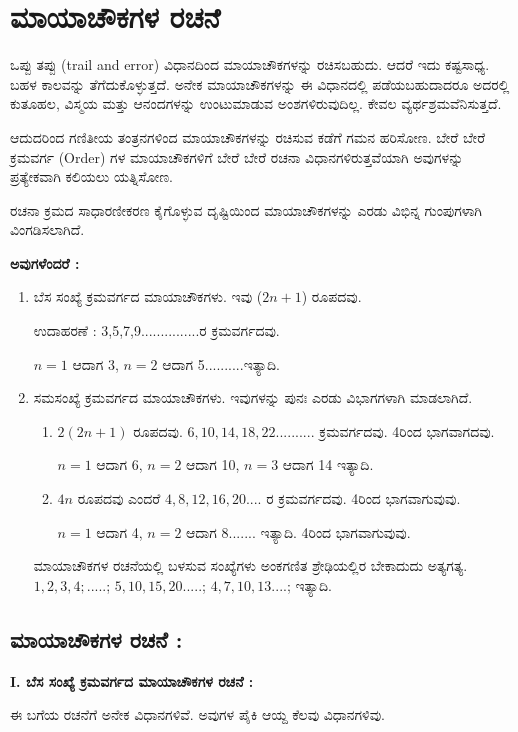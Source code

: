 \chapter{ಮಾಯಾಚೌಕಗಳ ರಚನೆ}
ಒಪ್ಪು ತಪ್ಪು (trail and error) ವಿಧಾನದಿಂದ ಮಾಯಾಚೌಕಗಳನ್ನು ರಚಿಸಬಹುದು. ಆದರೆ ಇದು ಕಷ್ಟಸಾಧ್ಯ. ಬಹಳ ಕಾಲವನ್ನು ತೆಗೆದುಕೊಳ್ಳುತ್ತದೆ. ಅನೇಕ ಮಾಯಾಚೌಕಗಳನ್ನು ಈ ವಿಧಾನದಲ್ಲಿ ಪಡೆಯಬಹುದಾದರೂ ಅದರಲ್ಲಿ ಕುತೂಹಲ, ವಿಸ್ಮಯ ಮತ್ತು ಆನಂದಗಳನ್ನು ಉಂಟುಮಾಡುವ ಅಂಶಗಳಿರುವುದಿಲ್ಲ. ಕೇವಲ ವ್ಯರ್ಥಶ್ರಮವೆನಿಸುತ್ತದೆ.

ಆದುದರಿಂದ ಗಣಿತೀಯ ತಂತ್ರನಗಳಿಂದ ಮಾಯಾಚೌಕಗಳನ್ನು ರಚಿಸುವ ಕಡೆಗೆ ಗಮನ ಹರಿಸೋಣ. ಬೇರೆ ಬೇರೆ ಕ್ರಮವರ್ಗ (Order) ಗಳ ಮಾಯಾಚೌಕಗಳಿಗೆ ಬೇರೆ ಬೇರೆ ರಚನಾ ವಿಧಾನಗಳಿರುತ್ತವೆಯಾಗಿ ಅವುಗಳನ್ನು ಪ್ರತ್ಯೇಕವಾಗಿ ಕಲಿಯಲು ಯತ್ನಿಸೋಣ.

ರಚನಾ ಕ್ರಮದ ಸಾಧಾರಣೀಕರಣ ಕೈಗೊಳ್ಳುವ ದೃಷ್ಟಿಯಿಂದ ಮಾಯಾಚೌಕಗಳನ್ನು ಎರಡು ವಿಭಿನ್ನ ಗುಂಪುಗಳಾಗಿ ವಿಂಗಡಿಸಲಾಗಿದೆ.

\noindent \textbf{ಅವುಗಳೆಂದರೆ :}

\begin{enumerate}
	\item ಬೆಸ ಸಂಖ್ಯೆ ಕ್ರಮವರ್ಗದ ಮಾಯಾಚೌಕಗಳು. ಇವು ($2n+1$) ರೂಪದವು.

	ಉದಾಹರಣೆ : 3,5,7,9...............ರ ಕ್ರಮವರ್ಗದವು.

	$n=1$ ಆದಾಗ 3, $n=2$ ಆದಾಗ 5..........ಇತ್ಯಾದಿ.
	\item ಸಮಸಂಖ್ಯೆ ಕ್ರಮವರ್ಗದ ಮಾಯಾಚೌಕಗಳು. ಇವುಗಳನ್ನು ಪುನಃ ಎರಡು ವಿಭಾಗಗಳಾಗಿ ಮಾಡಲಾಗಿದೆ.
	\begin{enumerate}
		\item $2(2n+1)$ ರೂಪದವು. $6,10,14,18,22..........$ ಕ್ರಮವರ್ಗದವು. 4ರಿಂದ ಭಾಗವಾಗದವು.

		$n=1$ ಆದಾಗ 6, $n=2$ ಆದಾಗ 10, $n=3$ ಆದಾಗ 14 ಇತ್ಯಾದಿ.

		\item $4n$ ರೂಪದವು ಎಂದರೆ $4,8,12,16,20....$ ರ ಕ್ರಮವರ್ಗದವು. 4ರಿಂದ ಭಾಗವಾಗುವುವು.

		$n=1$ ಆದಾಗ 4, $n=2$ ಆದಾಗ $8.......$ ಇತ್ಯಾದಿ. 4ರಿಂದ ಭಾಗವಾಗುವುವು.
	\end{enumerate}
	ಮಾಯಾಚೌಕಗಳ ರಚನೆಯಲ್ಲಿ ಬಳಸುವ ಸಂಖ್ಯೆಗಳು ಅಂಕಗಣಿತ ಶ್ರೇಢಿಯಲ್ಲಿರ ಬೇಕಾದುದು ಅತ್ಯಗತ್ಯ. $1,2,3,4; .....$; $5,10,15,20.....$; $4,7,10,13....$; ಇತ್ಯಾದಿ.
\end{enumerate}

\section{ಮಾಯಾಚೌಕಗಳ ರಚನೆ :}

\textbf{I. ಬೆಸ ಸಂಖ್ಯೆ ಕ್ರಮವರ್ಗದ ಮಾಯಾಚೌಕಗಳ ರಚನೆ :}

ಈ ಬಗೆಯ ರಚನೆಗೆ ಅನೇಕ ವಿಧಾನಗಳಿವೆ. ಅವುಗಳ ಪೈಕಿ ಆಯ್ದ ಕೆಲವು ವಿಧಾನಗಳಿವು.

